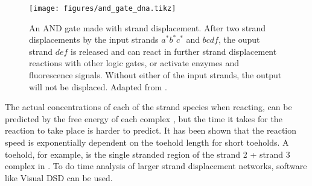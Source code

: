 \begin{figure}[H]
\centering
\texttt{[image: figures/and\_gate\_dna.tikz]}
\caption{An AND gate made with strand displacement. After two strand displacements by the input strands $a^*b^*c^*$ and $bcdf$, the ouput strand $def$ is released and can react in further strand displacement reactions with other logic gates, or activate enzymes and fluorescence signals. Without either of the input strands, the output will not be displaced. Adapted from \cite{Zhang2011}.}
\label{strand_displacement_and}
\end{figure}

The actual concentrations of each of the strand species when reacting, can be predicted by the free energy of each complex \cite{Zhang}, but the time it takes for the reaction to take place is harder to predict. It has been shown that the reaction speed is exponentially dependent on the toehold length for short toeholds. A toehold, for example, is the single stranded region of the strand 2 + strand 3 complex in . To do time analysis of larger strand displacement networks, software like Visual DSD \cite{Lakin2011} can be used.
